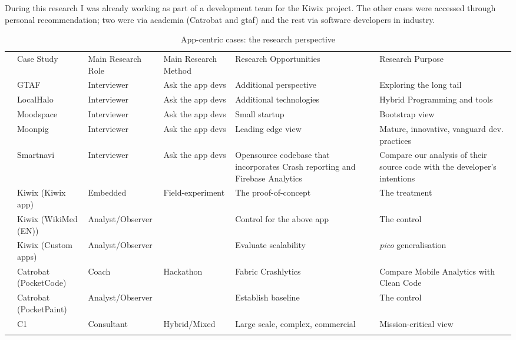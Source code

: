 During this research I was already working as part of a development team for the Kiwix project. The other cases were accessed through personal recommendation; two were via academia (Catrobat and \acrlong{gtaf}) and the rest via software developers in industry.


\begin{table}
    \centering
    \footnotesize
    \begin{tabular}{clllp{3.3cm}p{3.3cm}}\toprule
    & Case Study                 & Main Research Role &  Main Research Method   & Research Opportunities             & Research Purpose \\
    \arrayrulecolor{blue!70}\midrule
    \multirow{5}{*}{\large {\rotatebox[origin=r]{90}{Interviews}}} & GTAF                       & Interviewer        & Ask the app devs & Additional perspective & Exploring the long tail \\
    & LocalHalo                  & Interviewer        & Ask the app devs & Additional technologies & Hybrid Programming and tools \\
    & Moodspace                  & Interviewer        & Ask the app devs & Small startup &Bootstrap view \\
    & Moonpig                    & Interviewer        & Ask the app devs & Leading edge view & Mature, innovative, vanguard dev. practices \\
    & Smartnavi                  & Interviewer        & Ask the app devs & Opensource codebase that incorporates Crash reporting and Firebase Analytics & Compare our analysis of their source code with the developer's intentions \\
    \arrayrulecolor{blue!70}\midrule
    \multirow{6}{*}{\large \rotatebox[origin=r]{90}{Interventions}} & Kiwix (Kiwix app)          & Embedded           & Field-experiment   & The proof-of-concept      & The treatment \\
    & Kiwix (WikiMed (EN))       & Analyst/Observer   &                    & Control for the above app & The control  \\
    & Kiwix (Custom apps)        & Analyst/Observer   &                    & Evaluate scalability      & \textit{pico} generalisation \\
    \arrayrulecolor{blue!20}\cmidrule{2-6}
    & Catrobat (PocketCode)      & Coach              & Hackathon   & Fabric Crashlytics        & Compare Mobile Analytics with Clean Code \\
    & Catrobat (PocketPaint)     & Analyst/Observer   &                    & Establish baseline        & The control  \\
     \cmidrule{2-6}
    & C1                         & Consultant         & Hybrid/Mixed & Large scale, complex, commercial & Mission-critical view \\
    \arrayrulecolor{black}\bottomrule
    \end{tabular}
    \caption{App-centric cases: the research perspective}
    \label{tab:app-centric-studies-research-perspective}
\end{table}

